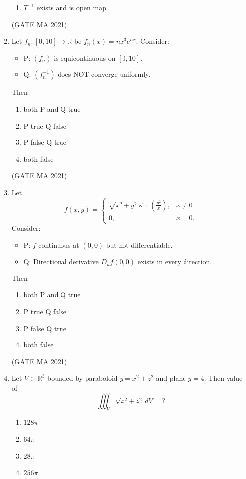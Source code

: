 \documentclass[journal,12pt,onecolumn]{IEEEtran}
\theoremstyle{remark}
\begin{document}
\begin{enumerate}
\begin{enumerate}
        \item $T^{-1}$ exists and is open map
    \end{enumerate}
\hfill(GATE MA 2021)
    \item Let $f_n: [0,10] \to \mathbb{R}$ be $f_n(x) = n x^3 e^{n x}$. Consider:
    \begin{itemize}
        \item P: $(f_n)$ is equicontinuous on $[0,10]$.
        \item Q: $(f_n^{-1})$ does NOT converge uniformly.
    \end{itemize}
    Then
    \begin{enumerate}
        \item both P and Q true
        \item P true Q false
        \item P false Q true
        \item both false
    \end{enumerate}
\hfill(GATE MA 2021)
    \item Let
    $$
    f(x,y) = \begin{cases}
    \sqrt{x^2 + y^2} \sin\left(\frac{y^2}{x}\right), & x \neq 0 \\
    0, & x=0.
    \end{cases}
    $$
    Consider:
    \begin{itemize}
        \item P: $f$ continuous at $(0,0)$ but not differentiable.
        \item Q: Directional derivative $D_u f(0,0)$ exists in every direction.
    \end{itemize}
    Then
    \begin{enumerate}
        \item both P and Q true
        \item P true Q false
        \item P false Q true
        \item both false
    \end{enumerate}
\hfill(GATE MA 2021)
    \item Let $V \subset \mathbb{R}^3$ bounded by paraboloid $y = x^2 + z^2$ and plane $y=4$. Then value of
    $$
    \iiint_V \sqrt{x^2 + z^2} \, dV = ?
    $$
    \begin{enumerate}
        \item $128 \pi$
        \item $64 \pi$
        \item $28 \pi$
        \item $256 \pi$

\end{enumerate}
\end{enumerate}
\end{document}
